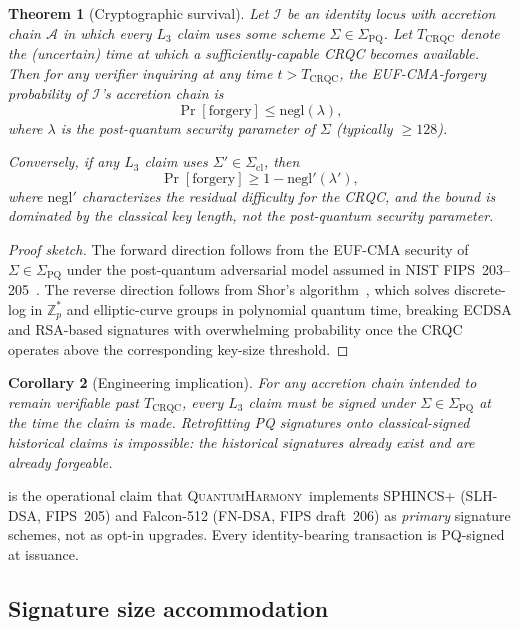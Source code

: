 \documentclass[11pt,a4paper,parskip=half-,DIV=12,headings=standardclasses]{scrartcl}
\theoremstyle{ncthm}
\newtheorem{theorem}{Theorem}[section]
\newtheorem{corollary}[theorem]{Corollary}
\theoremstyle{ncdef}
\newcommand{\identity}{\mathcal{I}}
\newcommand{\accretion}{\mathcal{A}}
\newcommand{\pqset}{\Sigma_{\mathrm{PQ}}}
\newcommand{\Negl}{\mathrm{negl}}
\newcommand{\qh}{\textsc{QuantumHarmony}}
\begin{document}
\begin{theorem}[Cryptographic survival]\label{thm:cryptographic-survival}
Let $\identity$ be an identity locus with accretion chain $\accretion$
in which every $L_3$ claim uses some scheme $\Sigma \in \pqset$. Let
$T_{\mathrm{CRQC}}$ denote the (uncertain) time at which a
sufficiently-capable CRQC becomes available. Then for any verifier
inquiring at any time $t > T_{\mathrm{CRQC}}$, the
EUF-CMA-forgery probability of $\identity$'s accretion chain is
\[
\Pr[\text{forgery}] \leq \Negl(\lambda),
\]
where $\lambda$ is the post-quantum security parameter of $\Sigma$
(typically $\geq 128$).

Conversely, if any $L_3$ claim uses
$\Sigma' \in \Sigma_{\mathrm{cl}}$, then
\[
\Pr[\text{forgery}] \geq 1 - \Negl'(\lambda'),
\]
where $\Negl'$ characterizes the residual difficulty for the CRQC, and
the bound is dominated by the classical key length, not the
post-quantum security parameter.
\end{theorem}

\begin{proof}[Proof sketch]
The forward direction follows from the EUF-CMA security of
$\Sigma \in \pqset$ under the post-quantum adversarial model assumed
in NIST FIPS~203--205~\cite{nist-fips-203,nist-fips-204,nist-fips-205}.
The reverse direction follows from Shor's
algorithm~\cite{shor-1994}, which solves discrete-log in $\mathbb{Z}_p^*$
and elliptic-curve groups in polynomial quantum time, breaking ECDSA
and RSA-based signatures with overwhelming probability once the CRQC
operates above the corresponding key-size threshold.
\end{proof}

\begin{corollary}[Engineering implication]\label{cor:pq-must-now}
For any accretion chain intended to remain verifiable past
$T_{\mathrm{CRQC}}$, every $L_3$ claim must be signed under
$\Sigma \in \pqset$ \emph{at the time the claim is made}. Retrofitting
PQ signatures onto classical-signed historical claims is impossible:
the historical signatures already exist and are already forgeable.
\end{corollary}

 is the operational claim that \qh\ implements
SPHINCS+ (SLH-DSA, FIPS~205) and Falcon-512 (FN-DSA, FIPS draft~206) as
\emph{primary} signature schemes, not as opt-in upgrades. Every
identity-bearing transaction is PQ-signed at issuance.

\subsection{Signature size accommodation}
\end{document}
